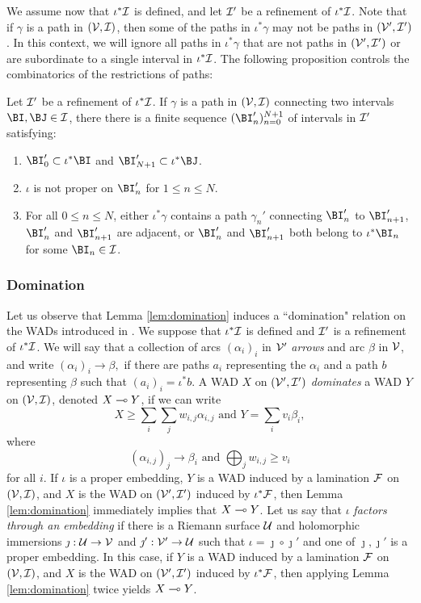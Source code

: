 \documentclass[12pt]{amsart}
\begin{document}
We assume now that $\iota^*\mathcal I$ is defined, and let $\mathcal I'$ be a refinement of $\iota^*\mathcal I$. Note that if $\gamma$ is a path in $(\mathcal V, \mathcal I)$, then some of the paths in $\iota^*\gamma$ may not be paths in $(\mathcal V',\mathcal I')$. 
In this context, we will ignore all paths in $\iota^*\gamma$ that are not paths in $(\mathcal V', \mathcal I')$ or are subordinate to a single interval in $\iota^*\mathcal I$. 
The following proposition controls the combinatorics of the restrictions of paths:
\begin{prop}\label{prop:itineraries}
    Let $\mathcal I'$ be a refinement of $\iota^*\mathcal I$. 
	If $\gamma$ is a path in $(\mathcal V, \mathcal I)$ connecting two intervals $\BI, \BJ\in \II$, there there is a finite sequence $(\BI_n')_{n=0}^{N+1}$ of intervals in $\mathcal I'$ satisfying:
	\begin{enumerate}
		\item $\BI_0'\subset \iota^*\BI$ and $\BI_{N+1}'\subset \iota^*\BJ$.
        \item $\iota$ is not proper on $\BI_n'$ for $1\leq n \leq N$.
		\item For all $0\leq n \leq N$, either $\iota^*\gamma$ contains a path $\gamma_n'$ connecting $\BI_n'$ to $\BI_{n+1}'$, $\BI_{n}'$ and $\BI_{n+1}'$ are adjacent, or $\BI_n'$ and $\BI_{n+1}'$ both belong to $\iota^*\BI_n$
		for some $\BI_n\in \II$. 
	\end{enumerate}
\end{prop}




\subsubsection{Domination}\label{sec:domination}
Let us observe that Lemma \ref{lem:domination} induces a ``domination" relation on the WADs introduced in \cite{K06}. We suppose that $\iota^*\mathcal I$ is defined and $\mathcal I'$ is a refinement of $\iota^*\mathcal I$. 
We will say that a collection of arcs $(\alpha_i)_i$ in $\mathcal V'$ \emph{arrows} and arc $\beta$ in $\mathcal V$, and write $(\alpha_i)_i\to \beta,$ if there are paths $a_i$ representing the $\alpha_i$ and a path $b$ representing $\beta$ such that $(a_i)_i= \iota^* b$.
A WAD $X$ on $(\mathcal V', \mathcal I')$ \emph{dominates}  a WAD $Y$ on $(\mathcal V, \mathcal I)$, denoted $X\multimap Y$, if we can write 
$$X\geq \sum_i \sum_jw_{i,j}\alpha_{i, j} \text{ and }Y= \sum_i v_i\beta_i,$$
where $$(\alpha_{i, j})_j\to \beta_i \text{ and }\bigoplus_jw_{i, j}\geq v_i$$
for all $i$. 
If $\iota$ is a proper embedding, $Y$ is a WAD induced by a lamination $\mathcal F$ on $(\mathcal V, \mathcal I)$, and $X$ is the WAD on $(\mathcal V', \mathcal I')$ induced by $\iota^*\mathcal F$, then Lemma \ref{lem:domination} immediately implies that $X\multimap Y$.
Let us say that $\iota$ \emph{factors through an embedding} if there is a Riemann surface $\mathcal U$ and holomorphic immersions $\jmath: \mathcal U\to \mathcal V$ and $\jmath': \mathcal V'\to \mathcal U$ such that $\iota = \jmath\circ \jmath'$ and one of $\jmath, \jmath'$ is a proper embedding. 
In this case, if $Y$ is a WAD induced by a lamination $\mathcal F$ on $(\mathcal V, \mathcal I)$, and $X$ is the WAD on $(\mathcal V', \mathcal I')$ induced by $\iota^*\mathcal F$, then 
applying 
Lemma \ref{lem:domination} twice yields $X\multimap Y$.
\end{document}
